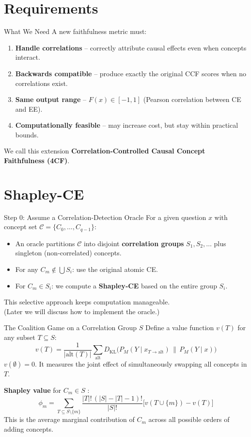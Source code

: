 \documentclass[aspectratio=169]{beamer}
\begin{document}
\section{Requirements}
\begin{frame}{What We Need}
A new faithfulness metric must:
\begin{enumerate}
  \item \textbf{Handle correlations} – correctly attribute causal effects even when concepts interact.
  \item \textbf{Backwards compatible} – produce exactly the original CCF scores when no correlations exist.
  \item \textbf{Same output range} – $F(x) \in [-1,1]$ (Pearson correlation between CE and EE).
  \item \textbf{Computationally feasible} – may increase cost, but stay within practical bounds.
\end{enumerate}
\medskip
We call this extension \textbf{Correlation‑Controlled Causal Concept Faithfulness (4CF)}.
\end{frame}

\section{Shapley-CE}
\begin{frame}{Step 0: Assume a Correlation‑Detection Oracle}
For a given question $x$ with concept set $\mathcal{C} = \{C_0,\dots,C_{q-1}\}$:
\begin{itemize}
  \item An oracle partitions $\mathcal{C}$ into disjoint \textbf{correlation groups} $S_1, S_2, \dots$ plus singleton (non‑correlated) concepts.
  \item For any $C_m \notin \bigcup S_i$: use the original atomic CE.
  \item For $C_m \in S_i$: we compute a \textbf{Shapley‑CE} based on the entire group $S_i$.
\end{itemize}
\vspace{0.5em}
This selective approach keeps computation manageable. \\(Later we will discuss how to implement the oracle.)
\end{frame}

\begin{frame}{The Coalition Game on a Correlation Group $S$}
Define a value function $v(T)$ for any subset $T \subseteq S$:
\[
v(T) = \frac{1}{|\text{alt}(T)|} \sum_{\text{alt}} D_{\mathrm{KL}}\!\Big(P_M(Y \mid x_{T \to \text{alt}}) \,\Big\|\, P_M(Y \mid x) \Big)
\]
$v(\emptyset)=0$. \quad It measures the joint effect of simultaneously swapping all concepts in $T$.

\pause
\textbf{Shapley value} for $C_m \in S$ \cite{molnarInterpretableMachineLearning2025}:
\[
\phi_m = \sum_{T \subseteq S \setminus \{m\}} \frac{|T|!\, (|S|-|T|-1)!}{|S|!} \big[ v(T \cup \{m\}) - v(T) \big]
\]
This is the average marginal contribution of $C_m$ across all possible orders of adding concepts.
\end{frame}
\end{document}
